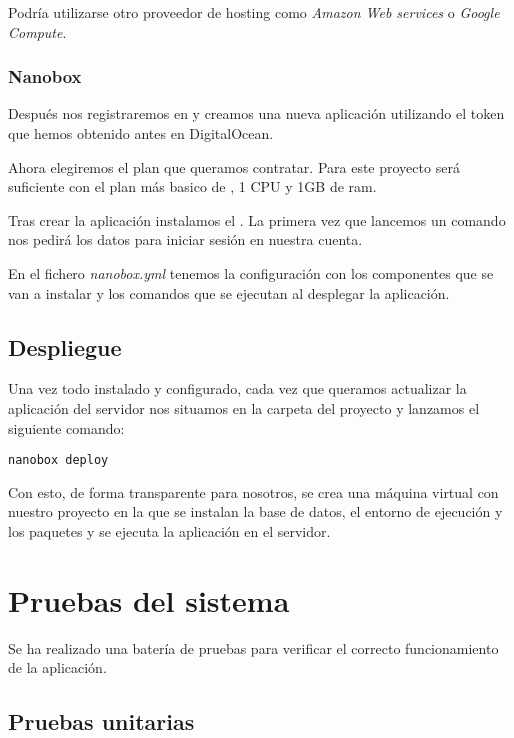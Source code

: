 Podría utilizarse otro proveedor de hosting como \textit{Amazon Web services} o \textit{Google Compute}.

\subsubsection{Nanobox}

Después nos registraremos en  y creamos una nueva aplicación utilizando el token que hemos obtenido antes en DigitalOcean.

Ahora elegiremos el plan que queramos contratar. Para este proyecto será suficiente con el plan más basico de , 1 CPU y 1GB de ram.

Tras crear la aplicación instalamos el . La primera vez que lancemos un comando nos pedirá los datos para iniciar sesión en nuestra cuenta.

En el fichero \textit{nanobox.yml} tenemos la configuración con los componentes que se van a instalar y los comandos que se ejecutan al desplegar la aplicación.

\subsection{Despliegue}


Una vez todo instalado y configurado, cada vez que queramos actualizar la aplicación del servidor nos situamos en la carpeta del proyecto y lanzamos el siguiente comando:

\begin{lstlisting}
nanobox deploy
\end{lstlisting}

Con esto, de forma transparente para nosotros, se crea una máquina virtual con nuestro proyecto en la que se instalan la base de datos, el entorno de ejecución y los paquetes y se ejecuta la aplicación en el servidor.

\section{Pruebas del sistema}

Se ha realizado una batería de pruebas para verificar el correcto funcionamiento de la aplicación.

\subsection{Pruebas unitarias}

